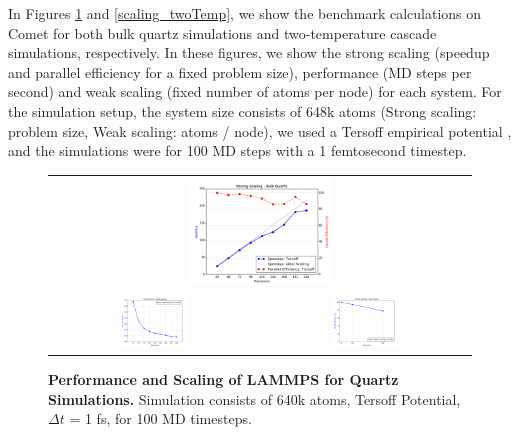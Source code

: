 \documentclass{proposalnsf}
\begin{document}
In Figures \ref{scaling_quartz} and \ref{scaling_twoTemp}, we show the benchmark calculations on Comet for both bulk quartz simulations and two-temperature cascade simulations, respectively. In these figures, we show the strong scaling (speedup and parallel efficiency for a fixed problem size), performance (MD steps per second) and weak scaling (fixed number of atoms per node) for each system. For the simulation setup, the system size consists of 648k atoms (Strong scaling: problem size, Weak scaling: atoms / node), we used a Tersoff empirical potential \cite{Tersoff1988, Kumagai2007}, and the simulations were for 100 MD steps with a 1 femtosecond timestep.

\begin{figure}[H]
  \begin{center}
 
  \begin{tabular}{cc}
    \multicolumn{2}{c}{\includegraphics[width=0.35\textwidth]{graphics/comet_strong_quartz.png}} \\
          \includegraphics[width=0.35\textwidth]{graphics/comet_perf_quartz.png} &
    \includegraphics[width=0.35\textwidth]{graphics/comet_weak_quartz.png} \\
  \end{tabular}
  \caption{\textbf{Performance and Scaling of LAMMPS for Quartz Simulations.} Simulation consists of 640k atoms, Tersoff Potential, $\Delta t$ = 1 fs, for 100 MD timesteps.}\label{scaling_quartz}
  
    \end{center}
\end{figure}
\end{document}
